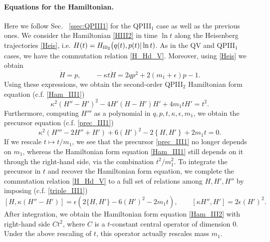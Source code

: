 \documentclass[12pt,a4paper]{article}
\numberwithin{equation}{section}
\newcommand{\III}{\scalebox{.6}{III}}
\begin{document}
\paragraph{Equations for the Hamiltonian.}
Here we follow Sec.~ \ref{ssec:QPIII1} for the QPIII$_1$ case as well as the previous ones. We consider the Hamiltonian \eqref{HIII2} in time $\ln t$ along the Heisenberg trajectories \eqref{Heis}, i.e. $H(t)=H_{\III_2}\big(q(t),p(t)|\ln t)$. 
As in the QV and QPIII$_1$ cases, we have the commutation relation \eqref{H_Hd_V}. Moreover, using \eqref{Heis} we obtain
\begin{equation}\label{Hder_III2}
\dot{H}=p,\qquad -\kappa t\ddot{H}=2qp^2+2(m_1{+}\epsilon)p-1.   
\end{equation}
Using these expressions, we obtain the second-order QPIII$_2$ Hamiltonian form equation (c.f. \eqref{Ham_III1})
\begin{equation}\label{Ham_III2}
\kappa^2(H''-H')^2-4H'(H-H')H'+4m_1tH'=t^2.
\end{equation}
Furthermore, computing $H'''$ as a polynomial in $q,p,t,\kappa,\epsilon,m_1$, we obtain the precursor equation (c.f. \eqref{prec_III1})
\begin{equation}\label{prec_III2}
\kappa^2(H'''-2H''+H')+6(H')^2-2\left\{H,H'\right\}+2m_1t=0. 
\end{equation} 
If we rescale $t\mapsto t/m_1$, we see that the precursor \eqref{prec_III1} no longer depends on $m_1$, whereas the Hamiltonian form equation \eqref{Ham_III1} still depends on it through the right-hand side, via the combination $t^2/m_1^2$. To integrate the precursor in $t$ and recover the Hamiltonian form equation, we complete the commutation relation \eqref{H_Hd_V} to a full set of relations among $H,H',H''$ by imposing (c.f. \eqref{triple_III1}) 
\begin{equation}\label{triple_III2}
[H,\kappa(H''{-}H')]=\epsilon\left(2\{H,H'\}-6(H')^2-2m_1t\right), \qquad [\kappa H'',H']=2\epsilon(H')^2.
\end{equation}
After integration, we obtain the Hamiltonian form equation \eqref{Ham_III2} with right-hand side $Ct^2$, where $C$ is a $t$-constant central operator of dimension $0$. Under the above rescaling of $t$, this operator actually rescales mass $m_1$. 
\end{document}
